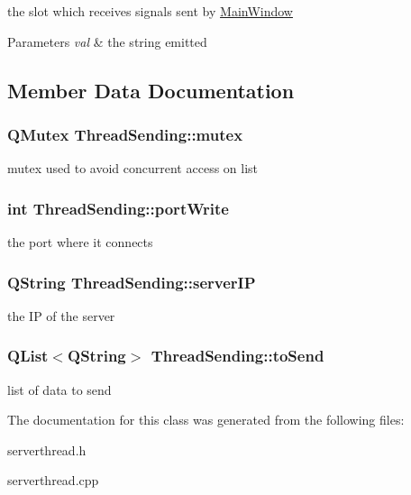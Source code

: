 the slot which receives signals sent by \hyperlink{class_main_window}{Main\-Window} 


\begin{DoxyParams}{Parameters}
{\em val} & the string emitted \\
\hline
\end{DoxyParams}


\subsection{Member Data Documentation}
\hypertarget{class_thread_sending_acf56dd5ae4ee3ac319e93307c6ef74ea}{
\subsubsection[{mutex}]{\setlength{\rightskip}{0pt plus 5cm}Q\-Mutex Thread\-Sending\-::mutex\hspace{0.3cm}{\ttfamily [private]}}}\label{class_thread_sending_acf56dd5ae4ee3ac319e93307c6ef74ea}
mutex used to avoid concurrent access on list \hypertarget{class_thread_sending_aa97703aeda03c6a18b2f300558ba5ae0}{
\subsubsection[{port\-Write}]{\setlength{\rightskip}{0pt plus 5cm}int Thread\-Sending\-::port\-Write\hspace{0.3cm}{\ttfamily [private]}}}\label{class_thread_sending_aa97703aeda03c6a18b2f300558ba5ae0}
the port where it connects \hypertarget{class_thread_sending_aeb557d91ac550a8efce1d43e130392f8}{
\subsubsection[{server\-I\-P}]{\setlength{\rightskip}{0pt plus 5cm}Q\-String Thread\-Sending\-::server\-I\-P\hspace{0.3cm}{\ttfamily [private]}}}\label{class_thread_sending_aeb557d91ac550a8efce1d43e130392f8}
the I\-P of the server \hypertarget{class_thread_sending_a381edbf0d9460a47a9a75a27c3918ae6}{
\subsubsection[{to\-Send}]{\setlength{\rightskip}{0pt plus 5cm}Q\-List$<$Q\-String$>$ Thread\-Sending\-::to\-Send\hspace{0.3cm}{\ttfamily [private]}}}\label{class_thread_sending_a381edbf0d9460a47a9a75a27c3918ae6}
list of data to send 

The documentation for this class was generated from the following files\-:\begin{DoxyCompactItemize}
\item 
serverthread.\-h\item 
serverthread.\-cpp\end{DoxyCompactItemize}
